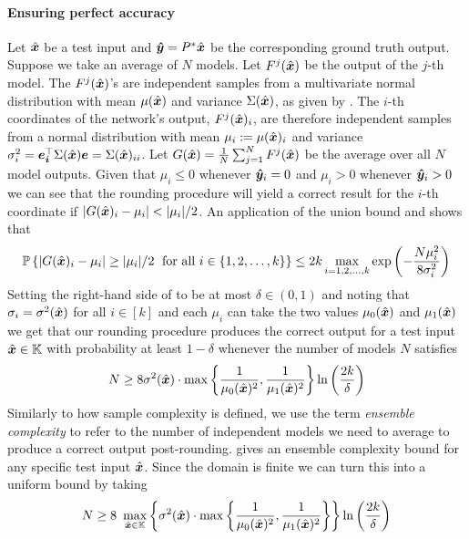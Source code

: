 \paragraph{Ensuring perfect accuracy} Let $\hat{\boldsymbol{x}}$ be a test input and $\boldsymbol{\hat{y}} = P^*\hat{\boldsymbol{x}}$ be the corresponding ground truth output. Suppose we take an average of $N$ models. Let $F^j(\hat{\boldsymbol{x}})$ be the output of the $j$-th model. The $F^j(\hat{\boldsymbol{x}})$'s are independent samples from a multivariate normal distribution with mean $\mu(\hat{\boldsymbol{x}})$ and variance $\Sigma(\hat{\boldsymbol{x}})$, as given by . The $i$-th coordinates of the network's output, $F^{j}(\hat{\boldsymbol{x}})_i$, are therefore independent samples from a normal distribution with mean $\mu_i := \mu(\hat{\boldsymbol{x}})_i$ and variance $\sigma_i^2 = \boldsymbol{e_i}^\top \Sigma(\hat{\boldsymbol{x}})\boldsymbol{e} = \Sigma(\hat{\boldsymbol{x}})_{ii}$. Let $G(\hat{\boldsymbol{x}}) = \frac{1}{N} \sum_{j=1}^N F^j(\hat{\boldsymbol{x}})$ be the average over all $N$ model outputs. Given that $\mu_i \leq 0$ whenever $\boldsymbol{\hat{y}}_i = 0$ and $\mu_i > 0$ whenever $\boldsymbol{\hat{y}}_i > 0$ we can see that the rounding procedure will yield a correct result for the $i$-th coordinate if $|G(\hat{\vect{x}})_i - \mu_i| <|\mu_i|/2$. An application of the union bound and  shows that 
\begin{equation}
\label{eq:ensemble_bound}
\mathbb{P}\left\{|G(\hat{\boldsymbol{x}})_i - \mu_i| \geq |\mu_i|/2 \; \text{ for all }i\in \{1,2,\dots,k\} \right\} \leq 2k \max_{i=1,2,\dots,k}\exp\left(-\frac{N\mu_i^2}{8\sigma_i^2}\right)
\end{equation}
Setting the right-hand side of  to be at most $\delta \in (0,1)$ and noting that $\sigma_i = \sigma^2(\hat{\boldsymbol{x}})$ for all $i \in [k]$ and each $\mu_i$ can take the two values $\mu_0(\hat{\boldsymbol{x}})$ and $\mu_1(\hat{\boldsymbol{x}})$ we get that our rounding procedure produces the correct output for a test input $\hat{\boldsymbol{x}} \in \mathbb{K}$ with probability at least $1-\delta$ whenever the number of models $N$ satisfies
\begin{equation}
\label{eq:ensemble_final}
N \geq 8 \sigma^2(\hat{\boldsymbol{x}}) \cdot \max\left\{ \frac{1}{\mu_0(\hat{\boldsymbol{x}})^2}, \frac{1}{\mu_1(\hat{\boldsymbol{x}})^2}\right\} \ln\left(\frac{2k}{\delta}\right)
\end{equation}
Similarly to how sample complexity is defined, we use the term \textit{ensemble complexity} to refer to the number of independent models we need to average to produce a correct output post-rounding.  gives an ensemble complexity bound for any specific test input $\hat{\boldsymbol{x}}$. Since the domain is finite we can turn this into a uniform bound by taking 
\begin{equation}
    \label{eq:ensemble_uniform}
    N \geq 8\ \max_{\hat{\boldsymbol{x}} \in \mathbb{K}} \left\{ \sigma^2(\hat{\boldsymbol{x}}) \cdot \max\left\{ \frac{1}{\mu_0(\hat{\boldsymbol{x}})^2}, \frac{1}{\mu_1(\hat{\boldsymbol{x}})^2}\right\}\right\} \ln\left(\frac{2k}{\delta}\right)
\end{equation}

